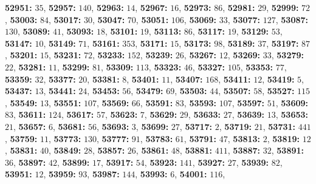 \textsf{\bfseries 52951:} $35$, \textsf{\bfseries 52957:} $140$, \textsf{\bfseries 52963:} $14$, \textsf{\bfseries 52967:} $16$, \textsf{\bfseries 52973:} $86$, \textsf{\bfseries 52981:} $29$, \textsf{\bfseries 52999:} $72$, \textsf{\bfseries 53003:} $84$, \textsf{\bfseries 53017:} $30$, \textsf{\bfseries 53047:} $70$, \textsf{\bfseries 53051:} $106$, \textsf{\bfseries 53069:} $33$, \textsf{\bfseries 53077:} $127$, \textsf{\bfseries 53087:} $130$, \textsf{\bfseries 53089:} $41$, \textsf{\bfseries 53093:} $18$, \textsf{\bfseries 53101:} $19$, \textsf{\bfseries 53113:} $86$, \textsf{\bfseries 53117:} $19$, \textsf{\bfseries 53129:} $53$, \textsf{\bfseries 53147:} $10$, \textsf{\bfseries 53149:} $71$, \textsf{\bfseries 53161:} $353$, \textsf{\bfseries 53171:} $15$, \textsf{\bfseries 53173:} $98$, \textsf{\bfseries 53189:} $37$, \textsf{\bfseries 53197:} $87$, \textsf{\bfseries 53201:} $15$, \textsf{\bfseries 53231:} $72$, \textsf{\bfseries 53233:} $152$, \textsf{\bfseries 53239:} $26$, \textsf{\bfseries 53267:} $12$, \textsf{\bfseries 53269:} $33$, \textsf{\bfseries 53279:} $22$, \textsf{\bfseries 53281:} $11$, \textsf{\bfseries 53299:} $81$, \textsf{\bfseries 53309:} $113$, \textsf{\bfseries 53323:} $46$, \textsf{\bfseries 53327:} $105$, \textsf{\bfseries 53353:} $77$, \textsf{\bfseries 53359:} $32$, \textsf{\bfseries 53377:} $20$, \textsf{\bfseries 53381:} $8$, \textsf{\bfseries 53401:} $11$, \textsf{\bfseries 53407:} $168$, \textsf{\bfseries 53411:} $12$, \textsf{\bfseries 53419:} $5$, \textsf{\bfseries 53437:} $13$, \textsf{\bfseries 53441:} $24$, \textsf{\bfseries 53453:} $56$, \textsf{\bfseries 53479:} $69$, \textsf{\bfseries 53503:} $44$, \textsf{\bfseries 53507:} $58$, \textsf{\bfseries 53527:} $115$, \textsf{\bfseries 53549:} $13$, \textsf{\bfseries 53551:} $107$, \textsf{\bfseries 53569:} $66$, \textsf{\bfseries 53591:} $83$, \textsf{\bfseries 53593:} $107$, \textsf{\bfseries 53597:} $51$, \textsf{\bfseries 53609:} $83$, \textsf{\bfseries 53611:} $124$, \textsf{\bfseries 53617:} $57$, \textsf{\bfseries 53623:} $7$, \textsf{\bfseries 53629:} $29$, \textsf{\bfseries 53633:} $27$, \textsf{\bfseries 53639:} $13$, \textsf{\bfseries 53653:} $21$, \textsf{\bfseries 53657:} $6$, \textsf{\bfseries 53681:} $56$, \textsf{\bfseries 53693:} $3$, \textsf{\bfseries 53699:} $27$, \textsf{\bfseries 53717:} $2$, \textsf{\bfseries 53719:} $21$, \textsf{\bfseries 53731:} $441$, \textsf{\bfseries 53759:} $11$, \textsf{\bfseries 53773:} $130$, \textsf{\bfseries 53777:} $91$, \textsf{\bfseries 53783:} $61$, \textsf{\bfseries 53791:} $47$, \textsf{\bfseries 53813:} $2$, \textsf{\bfseries 53819:} $12$, \textsf{\bfseries 53831:} $40$, \textsf{\bfseries 53849:} $28$, \textsf{\bfseries 53857:} $26$, \textsf{\bfseries 53861:} $48$, \textsf{\bfseries 53881:} $411$, \textsf{\bfseries 53887:} $32$, \textsf{\bfseries 53891:} $36$, \textsf{\bfseries 53897:} $42$, \textsf{\bfseries 53899:} $17$, \textsf{\bfseries 53917:} $54$, \textsf{\bfseries 53923:} $141$, \textsf{\bfseries 53927:} $27$, \textsf{\bfseries 53939:} $82$, \textsf{\bfseries 53951:} $12$, \textsf{\bfseries 53959:} $93$, \textsf{\bfseries 53987:} $144$, \textsf{\bfseries 53993:} $6$, \textsf{\bfseries 54001:} $116$, 

